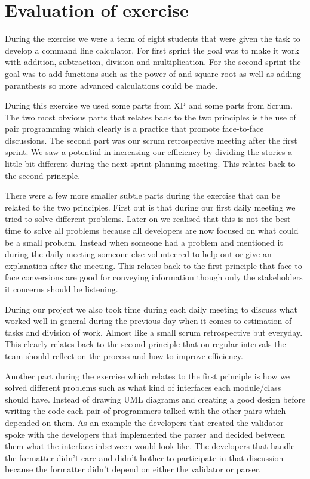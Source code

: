 \section{Evaluation of exercise}
During the exercise we were a team of eight students that were given the task
to develop a command line calculator. For first sprint the goal was to make it
work with addition, subtraction, division and multiplication. For the second
sprint the goal was to add functions such as the power of and square root as
well as adding paranthesis so more advanced calculations could be made.

During this exercise we used some parts from XP and some parts from Scrum. The
two most obvious parts that relates back to the two principles is the use of
pair programming which clearly is a practice that promote face-to-face
discussions. The second part was our scrum retrospective meeting after the
first sprint. We saw a potential in increasing our efficiency by dividing the
stories a little bit different during the next sprint planning meeting. This
relates back to the second principle.

There were a few more smaller subtle parts during the exercise that can be
related to the two principles. First out is that during our first daily meeting we
tried to solve different problems. Later on we realised that this is not the
best time to solve all problems because all developers are now focused on what
could be a small problem. Instead when someone had a problem and mentioned it
during the daily meeting someone else volunteered to help out or give an
explanation after the meeting. This relates back to the first principle that
face-to-face conversions are good for conveying information though only the
stakeholders it concerns should be listening.

During our project we also took time during each daily meeting to discuss what
worked well in general during the previous day when it comes to estimation of
tasks and
division of work. Almost like a small scrum retrospective but everyday. This
clearly relates back to the second principle that on regular intervals the team
should reflect on the process and how to improve efficiency.

Another part during the exercise which relates to the first principle is how we
solved different problems such as what kind of interfaces each module/class
should have. Instead of drawing UML diagrams and creating a good design before
writing the code each pair of programmers talked with the other pairs which
depended on them. As an example the developers that created the validator spoke
with the developers that implemented the parser and decided between them what
the interface inbetween would look like. The developers that handle the
formatter didn't care and didn't bother to participate in that discussion
because the formatter didn't depend on either the validator or parser.
